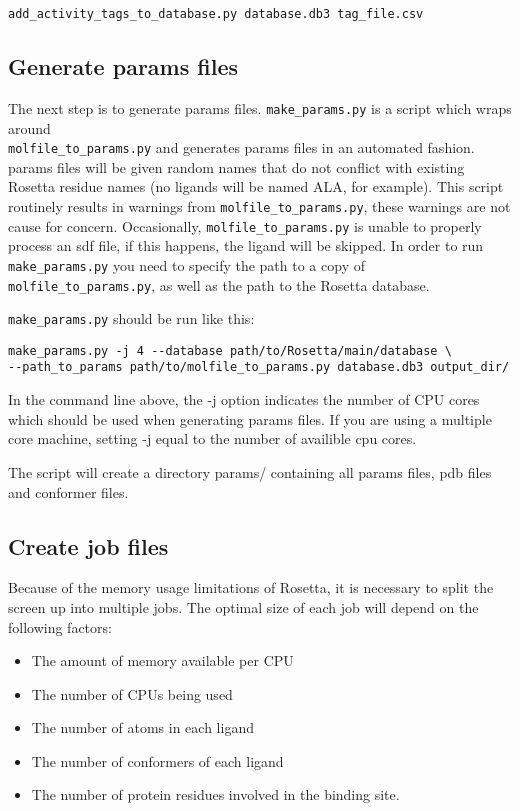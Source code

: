 \begin{verbatim}
add_activity_tags_to_database.py database.db3 tag_file.csv
\end{verbatim}

\subsection{Generate params files}

The next step is to generate params files. \texttt{make\_params.py} is a script which wraps around\\
\texttt{molfile\_to\_params.py} and generates params files in an automated fashion.
params files will be given random names that do not conflict with existing Rosetta residue names (no ligands will be named ALA, for example).
This script routinely results in warnings from \texttt{molfile\_to\_params.py}, these warnings are not cause for concern. 
Occasionally, \texttt{molfile\_to\_params.py} is unable to properly process an sdf file, if this happens, the ligand will be skipped. 
In order to run \texttt{make\_params.py} you need to specify the path to a copy of \texttt{molfile\_to\_params.py}, as well as the path to the Rosetta database.

\texttt{make\_params.py} should be run like this:

\begin{verbatim}
make_params.py -j 4 --database path/to/Rosetta/main/database \
--path_to_params path/to/molfile_to_params.py database.db3 output_dir/
\end{verbatim}

In the command line above, the -j option indicates the number of \ac{CPU} cores which should be used when generating params files.
If you are using a multiple core machine, setting -j equal to the number of availible cpu cores.

The script will create a directory params/ containing all params files, pdb files and conformer files.

\subsection{Create job files}

Because of the memory usage limitations of Rosetta, it is necessary to split the screen up into multiple jobs. 
The optimal size of each job will depend on the following factors:

\begin{itemize}
\item The amount of memory available per \ac{CPU}
\item The number of \ac{CPU}s being used
\item The number of atoms in each ligand
\item The number of conformers of each ligand
\item The number of protein residues involved in the binding site.
\end{itemize}

